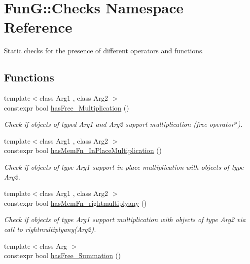 \hypertarget{namespaceFunG_1_1Checks}{}\section{Fun\+G\+:\+:Checks Namespace Reference}
\label{namespaceFunG_1_1Checks}


Static checks for the presence of different operators and functions.  


\subsection*{Functions}
\begin{DoxyCompactItemize}
\item 
{\footnotesize template$<$class Arg1 , class Arg2 $>$ }\\constexpr bool \hyperlink{namespaceFunG_1_1Checks_a81302dfb773e50401ec899c3b9a53c4c}{has\+Free\+\_\+\+Multiplication} ()
\begin{DoxyCompactList}\small\item\em Check if objects of typed Arg1 and Arg2 support multiplication (free operator$\ast$). \end{DoxyCompactList}\item 
{\footnotesize template$<$class Arg1 , class Arg2 $>$ }\\constexpr bool \hyperlink{namespaceFunG_1_1Checks_a1fb52331af88ccf29e380c8e5597e801}{has\+Mem\+Fn\+\_\+\+In\+Place\+Multiplication} ()
\begin{DoxyCompactList}\small\item\em Check if objects of type Arg1 support in-\/place multiplication with objects of type Arg2. \end{DoxyCompactList}\item 
{\footnotesize template$<$class Arg1 , class Arg2 $>$ }\\constexpr bool \hyperlink{namespaceFunG_1_1Checks_a88d1f93f87cf5f51d426fcfee862d6f6}{has\+Mem\+Fn\+\_\+rightmultiplyany} ()
\begin{DoxyCompactList}\small\item\em Check if objects of type Arg1 support multiplication with objects of type Arg2 via call to rightmultiplyany(\+Arg2). \end{DoxyCompactList}\item 
{\footnotesize template$<$class Arg $>$ }\\constexpr bool \hyperlink{namespaceFunG_1_1Checks_a8545906a81acf9f533c3342b0d02a6e9}{has\+Free\+\_\+\+Summation} ()

\end{DoxyCompactItemize}
